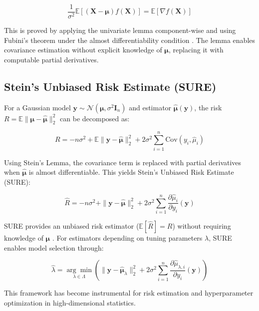 \documentclass{article}
\begin{document}
\begin{equation}
    \frac{1}{\sigma^2}\mathbb{E}[(\mathbf{X} - \boldsymbol{\mu})f(\mathbf{X})] = \mathbb{E}[\nabla f(\mathbf{X})]
\end{equation}

This is proved by applying the univariate lemma component-wise and using Fubini's theorem under the almost differentiability condition \cite{Tibshirani2015SteinS}. The lemma enables covariance estimation without explicit knowledge of $\boldsymbol{\mu}$, replacing it with computable partial derivatives.

\subsection{Stein's Unbiased Risk Estimate (SURE)}
For a Gaussian model $\mathbf{y} \sim \mathcal{N}(\boldsymbol{\mu}, \sigma^2 \mathbf{I}_n)$ and estimator $\boldsymbol{\hat{\mu}}(\mathbf{y})$, the risk $R = \mathbb{E}\|\boldsymbol{\mu} - \boldsymbol{\hat{\mu}}\|_2^2$ can be decomposed as:

\begin{equation}
R = -n\sigma^2 + \mathbb{E}\|\mathbf{y} - \boldsymbol{\hat{\mu}}\|_2^2 + 2\sigma^2 \sum_{i=1}^n \text{Cov}(y_i, \hat{\mu}_i)
\end{equation}


Using Stein's Lemma, the covariance term is replaced with partial derivatives when $\boldsymbol{\hat{\mu}}$ is almost differentiable. This yields Stein's Unbiased Risk Estimate (SURE):

\begin{equation}
    \widehat{R} = -n\sigma^2 + \|\mathbf{y} - \boldsymbol{\hat{\mu}}\|_2^2 + 2\sigma^2 \sum_{i=1}^n \frac{\partial \hat{\mu}_i}{\partial y_i}(\mathbf{y})
\end{equation}

SURE provides an unbiased risk estimator ($\mathbb{E}[\widehat{R}] = R$) without requiring knowledge of $\boldsymbol{\mu}$ \cite{Tibshirani2015SteinS}. For estimators depending on tuning parameters $\lambda$, SURE enables model selection through:

\begin{equation}
\hat{\lambda} = \underset{\lambda \in \Lambda}{\arg\min} \left( \|\mathbf{y} - \boldsymbol{\hat{\mu}}_\lambda\|_2^2 + 2\sigma^2 \sum_{i=1}^n \frac{\partial \hat{\mu}_{\lambda,i}}{\partial y_i}(\mathbf{y}) \right)
\end{equation}


This framework has become instrumental for risk estimation and hyperparameter optimization in high-dimensional statistics.
\end{document}
